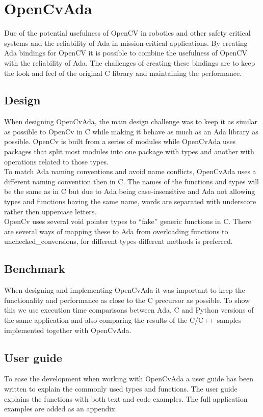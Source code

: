 \section{OpenCvAda}
Due of the potential usefulness of OpenCV in robotics and other safety critical systems and the reliability of Ada in mission-critical applications. By creating Ada bindings for OpenCV it is possible to combine the usefulness of OpenCV with the reliability of Ada. The challenges of creating these bindings are to keep the look and feel of the original C library and maintaining the performance.
\subsection{Design}
When designing OpenCvAda, the main design challenge was to keep it as similar as possible to OpenCv in C while making it behave as much as an Ada library as possible. OpenCv is built from a series of modules while OpenCvAda uses packages that split most modules into one package with types and another with operations related to those types.
\\
To match Ada naming conventions \cite{styleguide95} and avoid name conflicts, OpenCvAda uses a different naming convention then in C. The names of the functions and types will be the same as in C but due to Ada being case-insensitive and Ada not allowing types and functions having the same name, words are separated with underscore rather then uppercase letters.
\\
OpenCv uses several void pointer types to ``fake'' generic functions in C. There are several ways of mapping these to Ada from overloading functions to unchecked_conversions, for different types different methods is preferred.
\subsection{Benchmark}
When designing and implementing OpenCvAda it was important to keep the functionality and performance as close to the C precursor as possible. To show this we use execution time comparisons between Ada, C and Python versions of the same application and also comparing the results of the C/C++ samples implemented together with OpenCvAda.
\subsection{User guide}
To ease the development when working with OpenCvAda a user guide has been written to explain the commonly used types and functions. The user guide explains the functions with both text and code examples. The full application examples are added as an appendix.
